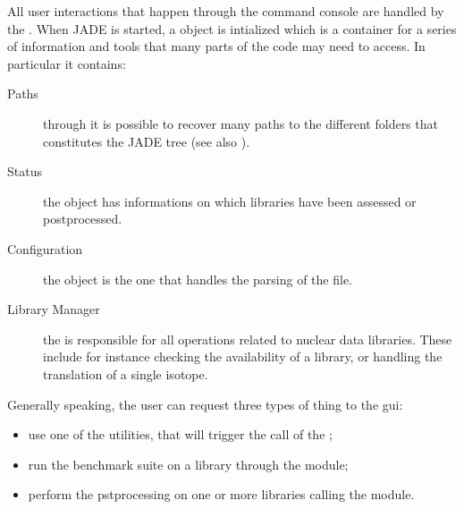 \documentclass[letterpaper,10pt,english]{sphinxmanual}
\begin{document}
\sphinxAtStartPar
All user interactions that happen through the command console are handled
by the . When JADE is started, a {\hyperref[\detokenize{api/initobjects:sessionob}]{}} object
is intialized which is a container for a series of information and tools
that many parts of the code may need to access. In particular it contains:
\begin{description}
\item[{Paths}] \leavevmode
\sphinxAtStartPar
through {\hyperref[\detokenize{api/initobjects:sessionob}]{}} it is possible to recover many paths to the
different folders that constitutes the JADE tree (see also {\hyperref[\detokenize{usage/folders:folders}]{}}).

\item[{Status}] \leavevmode
\sphinxAtStartPar
the {\hyperref[\detokenize{api/initobjects:statusob}]{}} object has informations on which libraries have
been assessed or post\sphinxhyphen{}processed.

\item[{Configuration}] \leavevmode
\sphinxAtStartPar
the {\hyperref[\detokenize{api/initobjects:confob}]{}} object is the one that handles the
parsing of the {\hyperref[\detokenize{usage/configuration:mainconfig}]{}} file.

\item[{Library Manager}] \leavevmode
\sphinxAtStartPar
the {\hyperref[\detokenize{api/initobjects:libmanagerob}]{}} is responsible for all operations related
to nuclear data libraries. These include for instance checking the
availability of a library, or handling the translation of a single isotope.

\end{description}

\sphinxAtStartPar
Generally speaking, the user can request three types of thing to the gui:
\begin{itemize}
\item {} 
\sphinxAtStartPar
use one of the utilities, that will trigger the call of the ;

\item {} 
\sphinxAtStartPar
run the benchmark suite on a library through the  module;

\item {} 
\sphinxAtStartPar
perform the pst\sphinxhyphen{}processing on one or more libraries calling the 
module.

\end{itemize}
\end{document}
